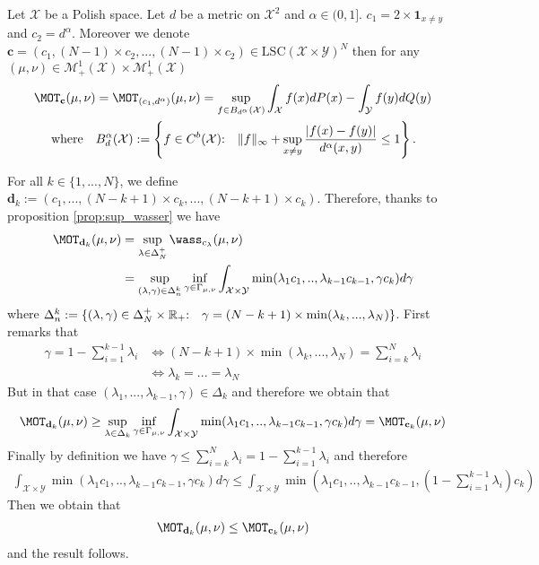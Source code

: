 \begin{prop*}
Let $\mathcal{X}$ be a Polish space. Let $d$ be a metric on $\mathcal{X}^2$ and $\alpha\in (0,1]$. $c_1= 2 \times \mathbf{1}_{x\neq y}$ and $c_2=d^{\alpha}$. Moreover we denote $\mathbf{c}=(c_1,(N-1)\times c_2,...,(N-1)\times c_2)\in \text{LSC}(\mathcal{X}\times\mathcal{Y})^N$
then for any $(\mu,\nu)\in\mathcal{M}_+^{1}(\mathcal{X})\times\mathcal{M}_+^{1}(\mathcal{X})$  
\begin{align*}
    \MOT_{\mathbf{c}}(\mu,\nu) &= \MOT_{(c_1,d^{\alpha})}(\mu,\nu)=\sup_{f\in B_{d^{\alpha}}(\mathcal{X})} \int_{\mathcal{X}} f(x) dP(x) - \int_{\mathcal{Y}} f(y) dQ(y)\\
    \text{where\quad}& B_d^{\alpha}(\mathcal{X}):=\left\{f\in C^{b}(\mathcal{X})\text{:}\quad \Vert f\Vert_{\infty}+\sup_{x\neq y}\frac{|f(x)-f(y)|}{d^{\alpha}(x,y)}\leq 1 \right\}.
\end{align*}
\end{prop*}

\begin{prv*}
For all $k\in\{1,...,N\}$, we define $\mathbf{d}_k:=(c_1,...,(N-k+1)\times c_k,...,(N-k+1)\times c_k)$. Therefore, thanks to proposition \ref{prop:sup_wasser} we have
\begin{align}
\MOT_{\mathbf{d}_k}(\mu,\nu)& = \sup_{\lambda\in\Delta_N^{+}} \wass_{c_\lambda}(\mu,\nu) \\
& = \sup_{(\lambda,\gamma)\in\Delta^k_n} \inf_{\gamma\in\Gamma_{\mu,\nu}}\int_{\mathcal{X}\times\mathcal{Y}} \min(\lambda_1 c_1,..,\lambda_{k-1}c_{k-1},\gamma c_k) d\gamma
\end{align}
where $\Delta^k_n:=\{(\lambda,\gamma)\in \Delta_N^{+}\times\mathbb{R}_{+}\text{:\quad } \gamma=(N-k+1)\times\min(\lambda_k,...,\lambda_N)\}$.
First remarks that
\begin{align}
    \gamma = 1 - \sum_{i=1}^{k-1} \lambda_i &\iff (N-k+1)\times\min(\lambda_k,...,\lambda_N) = \sum_{i=k}^{N} \lambda_i \\
    &\iff \lambda_k=...=\lambda_N
\end{align}
But in that case $(\lambda_1,...,\lambda_{k-1},\gamma)\in\Delta_k$ and therefore we obtain that 
\begin{align*}
     \MOT_{\mathbf{d}_k}(\mu,\nu) \geq \sup_{\lambda\in\Delta_k}\inf_{\gamma\in\Gamma_{\mu,\nu}}  \int_{\mathcal{X}\times\mathcal{Y}} \min(\lambda_1 c_1,..,\lambda_{k-1}c_{k-1},\gamma c_k) d\gamma = \MOT_{\mathbf{c}_k}(\mu,\nu) 
\end{align*}
Finally by definition we have  $\gamma\leq \sum_{i=k}^{N} \lambda_i = 1 -  \sum_{i=1}^{k-1} \lambda_i $ and therefore
\begin{align*}
 \int_{\mathcal{X}\times\mathcal{Y}} \min(\lambda_1 c_1,..,\lambda_{k-1}c_{k-1},\gamma c_k) d\gamma \leq  \int_{\mathcal{X}\times\mathcal{Y}} \min\left(\lambda_1 c_1,..,\lambda_{k-1}c_{k-1},\left(1 -  \sum_{i=1}^{k-1} \lambda_i\right) c_k\right) 
\end{align*}
Then we obtain that 
\begin{align*}
     \MOT_{\mathbf{d}_k}(\mu,\nu)\leq  \MOT_{\mathbf{c}_k}(\mu,\nu) 
\end{align*}
and the result follows.
\end{prv*}

